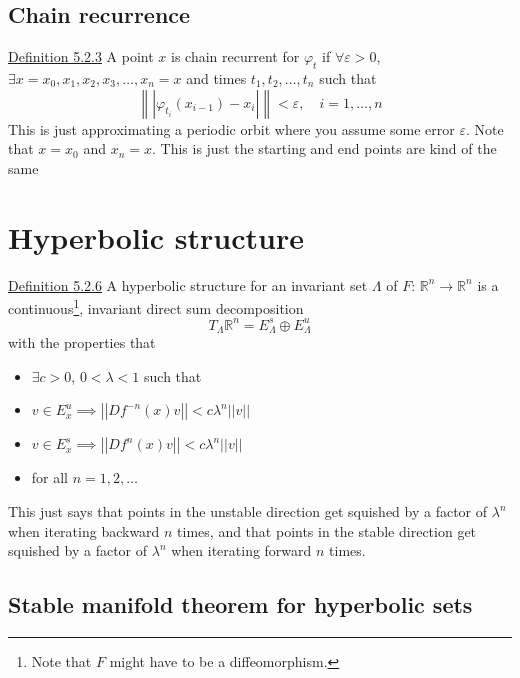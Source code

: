 \documentclass{article}
\begin{document}
\subsection{Chain recurrence}

\underline{Definition 5.2.3} A point $x$ is chain recurrent for $\varphi_t$ if $\forall \varepsilon >0$,\newline $\exists x=x_0,x_1,x_2, x_3,\ldots, x_n=x$ and times $t_1,t_2,\ldots, t_n$ such that 
\[
\left\|\left| \varphi_{t_i}(x_{i-1}) - x_i \right|\right\| < \varepsilon, \quad i=1,\ldots,n
\]
This is just approximating a periodic orbit where you assume some error $\varepsilon$. Note that $x=x_0$ and $x_n=x$. This is just the starting and end points are kind of the same 

\section{Hyperbolic structure}

\underline{Definition 5.2.6} A hyperbolic structure for an invariant set $\Lambda$ of $F:\, \mathbb{R}^n\to \mathbb{R}^n$ is a continuous\footnote{Note that $F$ might have to be a diffeomorphism.}, invariant direct sum decomposition 
\[
T_\Lambda \mathbb{R}^n = E^s_\Lambda \oplus E^u_\Lambda
\]
with the properties that 
\begin{itemize}
    \item $\exists c >0$, $0<\lambda < 1$ such that 
    \item $v\in E^u_x \implies \left|\left| Df^{-n}(x) v \right|\right| < c\lambda^n \left|\left| v \right|\right|$
    \item $v\in E^s_x \implies \left|\left| Df^{n}(x) v \right|\right| < c\lambda^n \left|\left| v \right|\right|$
    \item for all $n=1,2,\ldots$
\end{itemize}
This just says that points in the unstable direction get squished by a factor of $\lambda^n$ when iterating backward $n$ times, and that points in the stable direction get squished by a factor of $\lambda^n$ when iterating forward $n$ times.

\subsection{Stable manifold theorem for hyperbolic sets}
\end{document}
